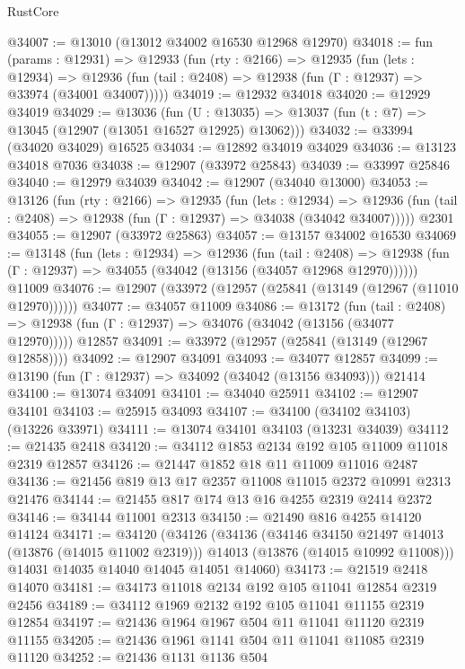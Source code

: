 \begin{lexlean}{RustCore}
\begin{coremodule}
@34007 := @13010 (@13012 @34002 @16530 @12968 @12970)
@34018 := fun (params : @12931) =>
  @12933
    (fun (rty : @2166) =>
    @12935
      (fun (lets : @12934) =>
      @12936 (fun (tail : @2408) => @12938 (fun (Γ : @12937) => @33974 (@34001 @34007)))))
@34019 := @12932 @34018
@34020 := @12929 @34019
@34029 := @13036
    (fun (U : @13035) => @13037 (fun (t : @7) => @13045 (@12907 (@13051 @16527 @12925) @13062)))
@34032 := @33994 (@34020 @34029) @16525
@34034 := @12892 @34019 @34029
@34036 := @13123 @34018 @7036
@34038 := @12907 (@33972 @25843)
@34039 := @33997 @25846
@34040 := @12979 @34039
@34042 := @12907 (@34040 @13000)
@34053 := @13126
    (fun (rty : @2166) =>
    @12935
      (fun (lets : @12934) =>
      @12936 (fun (tail : @2408) => @12938 (fun (Γ : @12937) => @34038 (@34042 @34007)))))
    @2301
@34055 := @12907 (@33972 @25863)
@34057 := @13157 @34002 @16530
@34069 := @13148
    (fun (lets : @12934) =>
    @12936
      (fun (tail : @2408) =>
      @12938 (fun (Γ : @12937) => @34055 (@34042 (@13156 (@34057 @12968 @12970))))))
    @11009
@34076 := @12907 (@33972 (@12957 (@25841 (@13149 (@12967 (@11010 @12970))))))
@34077 := @34057 @11009
@34086 := @13172
    (fun (tail : @2408) => @12938 (fun (Γ : @12937) => @34076 (@34042 (@13156 (@34077 @12970)))))
    @12857
@34091 := @33972 (@12957 (@25841 (@13149 (@12967 @12858))))
@34092 := @12907 @34091
@34093 := @34077 @12857
@34099 := @13190 (fun (Γ : @12937) => @34092 (@34042 (@13156 @34093))) @21414
@34100 := @13074 @34091
@34101 := @34040 @25911
@34102 := @12907 @34101
@34103 := @25915 @34093
@34107 := @34100 (@34102 @34103) (@13226 @33971)
@34111 := @13074 @34101 @34103 (@13231 @34039)
@34112 := @21435 @2418
@34120 := @34112 @1853 @2134 @192 @105 @11009 @11018 @2319 @12857
@34126 := @21447 @1852 @18 @11 @11009 @11016 @2487
@34136 := @21456 @819 @13 @17 @2357 @11008 @11015 @2372 @10991 @2313 @21476
@34144 := @21455 @817 @174 @13 @16 @4255 @2319 @2414 @2372
@34146 := @34144 @11001 @2313
@34150 := @21490 @816 @4255 @14120 @14124
@34171 := @34120
    (@34126
      (@34136
        (@34146 @34150 @21497 @14013 (@13876 (@14015 @11002 @2319)))
        @14013
        (@13876 (@14015 @10992 @11008)))
      @14031
      @14035
      @14040
      @14045
      @14051
      @14060)
@34173 := @21519 @2418 @14070
@34181 := @34173 @11018 @2134 @192 @105 @11041 @12854 @2319 @2456
@34189 := @34112 @1969 @2132 @192 @105 @11041 @11155 @2319 @12854
@34197 := @21436 @1964 @1967 @504 @11 @11041 @11120 @2319 @11155
@34205 := @21436 @1961 @1141 @504 @11 @11041 @11085 @2319 @11120
@34252 := @21436
    @1131
    @1136
    @504

\end{coremodule}
\end{lexlean}
